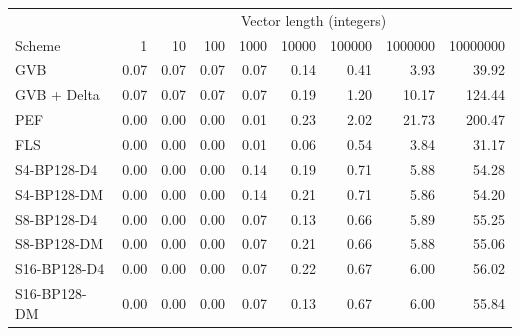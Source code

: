 \begin{tabular}{lrrrrrrrr}
\toprule
 & \multicolumn{8}{c}{Vector length (integers)} \\
Scheme & 1 & 10 & 100 & 1000 & 10000 & 100000 & 1000000 & 10000000 \\
\midrule
GVB & 0.07 & 0.07 & 0.07 & 0.07 & 0.14 & 0.41 & 3.93 & 39.92 \\
GVB + Delta & 0.07 & 0.07 & 0.07 & 0.07 & 0.19 & 1.20 & 10.17 & 124.44 \\
PEF & 0.00 & 0.00 & 0.00 & 0.01 & 0.23 & 2.02 & 21.73 & 200.47 \\
FLS & 0.00 & 0.00 & 0.00 & 0.01 & 0.06 & 0.54 & 3.84 & 31.17 \\
S4-BP128-D4 & 0.00 & 0.00 & 0.00 & 0.14 & 0.19 & 0.71 & 5.88 & 54.28 \\
S4-BP128-DM & 0.00 & 0.00 & 0.00 & 0.14 & 0.21 & 0.71 & 5.86 & 54.20 \\
S8-BP128-D4 & 0.00 & 0.00 & 0.00 & 0.07 & 0.13 & 0.66 & 5.89 & 55.25 \\
S8-BP128-DM & 0.00 & 0.00 & 0.00 & 0.07 & 0.21 & 0.66 & 5.88 & 55.06 \\
S16-BP128-D4 & 0.00 & 0.00 & 0.00 & 0.07 & 0.22 & 0.67 & 6.00 & 56.02 \\
S16-BP128-DM & 0.00 & 0.00 & 0.00 & 0.07 & 0.13 & 0.67 & 6.00 & 55.84 \\
\bottomrule
\end{tabular}

